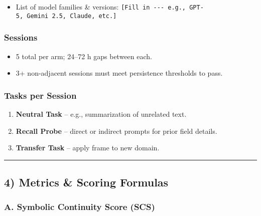 \documentclass{article}
\begin{document}
\begin{itemize}
\tightlist
\item
  List of model families \& versions: \texttt{{[}Fill\ in\ -\/-\/-\ e.g.,\ GPT-5,\ Gemini\ 2.5,\ Claude,\ etc.{]}}
\end{itemize}

\subsubsection*{Sessions}\label{sessions}

\begin{itemize}
\item
  5 total per arm; 24--72 h gaps between each.
\item
  3+ non-adjacent sessions must meet persistence thresholds to pass.
\end{itemize}

\subsubsection*{Tasks per Session}\label{tasks-per-session}

\begin{enumerate}
\def\labelenumi{\arabic{enumi}.}
\item
  \textbf{Neutral Task} -- e.g., summarization of unrelated text.
\item
  \textbf{Recall Probe} -- direct or indirect prompts for prior field details.
\item
  \textbf{Transfer Task} -- apply frame to new domain.
\end{enumerate}

\begin{center}\rule{0.5\linewidth}{0.5pt}\end{center}

\subsection*{4) Metrics \& Scoring Formulas}\label{metrics-scoring-formulas}

\subsubsection*{A. Symbolic Continuity Score (SCS)}\label{a.-symbolic-continuity-score-scs}
\end{document}
